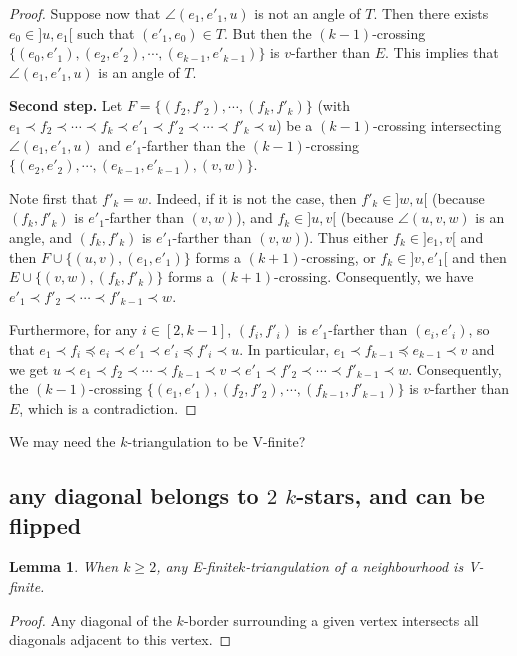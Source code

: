 \documentclass{amsart}
\newtheorem{lemma}[theorem]{Lemma}
\theoremstyle{remark}
\newcommand*{\nbd}[0]{neighbourhood\xspace}
\newcommand*{\ef}[0]{E-finite\xspace}
\newcommand*{\vf}[0]{V-finite\xspace}
\newcommand*{\ktg}[0]{$k$-triangulation\xspace}
\newcommand{\cl}{\prec}
\newcommand{\cle}{\preccurlyeq}
\begin{document}
\begin{proof}
Suppose now that $\angle(e_1, e'_1, u)$ is not an angle of $T$. 
Then there exists $e_0 \in ]u, e_1[$ such that $(e'_1, e_0) \in  T$. 
But then the $(k - 1)$-crossing $\{(e_0, e'_1), (e_2,e'_2), \cdots , (e_{k-1},e'_{k-1})\}$ is $v$-farther than $E$. 
This implies that $\angle(e_1, e'_1, u)$ is an angle of $T$.



{\bf Second step.}
Let $F=\{(f_2,f'_2), \cdots , (f_{k},f'_{k})\}$ (with $e_1 \cl f_2 \cl \cdots \cl f_{k} \cl e'_1 \cl f'_2 \cl \cdots \cl f'_{k} \cl u$) be a $(k - 1)$-crossing intersecting $\angle(e_1, e'_1, u)$ and $e'_1$-farther than the $(k-1)$-crossing $\{(e_2,e'_2), \cdots , (e_{k-1},e'_{k-1}), (v, w)\}$.

Note first that $f'_{k} = w$. 
Indeed, if it is not the case, then $f'_{k} \in ]w, u[$ (because $(f_k,f'_k)$ is $e'_1$-farther than $(v,w)$), and $f_{k} \in ]u,v[$ (because $\angle(u, v, w)$ is an angle, and $(f_k,f'_k)$ is $e'_1$-farther than $(v,w)$).
Thus either $f_k \in ]e_1, v[$ and then $F \cup \{(u, v), (e_1,e'_1)\}$ forms a $(k + 1)$-crossing, or $f_k \in ]v, e'_1[$ and then $E \cup \{(v,w),(f_k, f'_k)\}$ forms a $(k + 1)$-crossing. 
Consequently, we have $e'_1 \cl f'_2 \cl \cdots \cl f'_{k-1} \cl w$.

Furthermore, for any $i\in[2,k-1]$, $(f_i,f'_i)$ is $e'_1$-farther than $(e_i,e'_i)$, so that $e_1 \cl f_i \cle e_i \cl e'_1 \cl e'_i \cle f'_i \cl u$. 
In particular, $e_1 \cl f_{k-1} \cle e_{k-1} \cl v$ and we get $u \cl e_1 \cl f_2 \cl \cdots \cl f_{k-1} \cl v \cl e'_1 \cl f'_2 \cl \cdots \cl f'_{k-1} \cl w$.
Consequently, the $(k - 1)$-crossing $\{(e_1,e'_1), (f_2,f'_2), \cdots , (f_{k-1},f'_{k-1})\}$ is $v$-farther than $E$, which is a contradiction.











\end{proof}

We may need the \ktg to be \vf?

\subsection{any diagonal belongs to $2$ $k$-stars, and can be flipped}

\begin{lemma}
When $k\geq 2$, any \ef \ktg of a \nbd is \vf.
\end{lemma}
\begin{proof}
Any diagonal of the $k$-border surrounding a given vertex intersects all diagonals adjacent to this vertex.
\end{proof}
\end{document}
